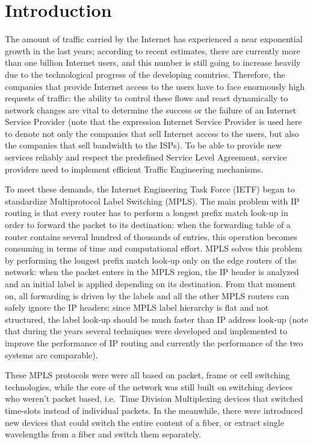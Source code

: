 \documentclass[10pt,a4paper]{report}
\begin{document}
\chapter{Introduction}
The amount of traffic carried by the Internet has experienced a near
exponential growth in the last years; according to recent estimates,
there are currently more than one billion Internet users, and this
number is still going to increase heavily due to the technological
progress of the developing countries. Therefore, the companies that
provide Internet access to the users have to face enormously high
requests of traffic: the ability to control these flows and react
dynamically to network changes are vital to determine the success or
the failure of an Internet Service Provider (note that the expression
Internet Service Provider is used here to denote not only the
companies that sell Internet access to the users, but also the
companies that sell bandwidth to the ISPs). To be able to provide new
services reliably and respect the predefined Service Level Agreement,
service providers need to implement efficient Traffic Engineering
mechanisms.

To meet these demands, the Internet Engineering Task Force (IETF)
began to standardize Multiprotocol Label Switching (MPLS). The main
problem with IP routing is that every router has to perform a longest
prefix match look-up in order to forward the packet to its
destination: when the forwarding table of a router contains several
hundred of thousands of entries, this operation becomes consuming in
terms of time and computational effort. MPLS solves this problem by
performing the longest prefix match look-up only on the edge routers
of the network: when the packet enters in the MPLS region, the IP
header is analyzed and an initial label is applied depending on its
destination. From that moment on, all forwarding is driven by the
labels and all the other MPLS routers can safely ignore the IP
headers: since MPLS label hierarchy is flat and not structured, the
label look-up should be much faster than IP address look-up (note that
during the years several techniques were developed and implemented to
improve the performance of IP routing and currently the performance of
the two systems are comparable).

\newpage

These MPLS protocols were were all based on packet, frame or cell
switching technologies, while the core of the network was still built
on switching devices who weren't packet based, i.e.\ Time Division
Multiplexing devices that switched time-slots instead of individual
packets. In the meanwhile, there were introduced new devices that
could switch the entire content of a fiber, or extract single
wavelengths from a fiber and switch them separately.
\end{document}
